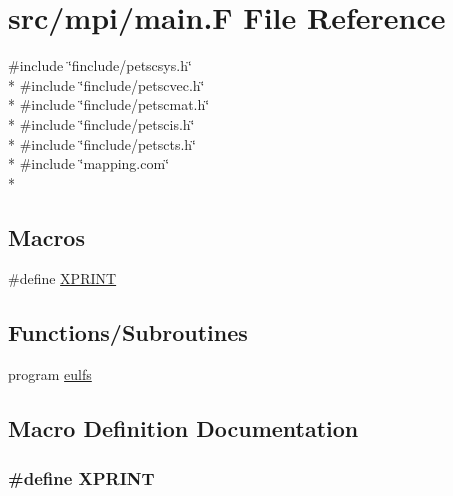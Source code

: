 \hypertarget{mpi_2main_8_f}{\section{src/mpi/main.F File Reference}
\label{mpi_2main_8_f}
}
{\ttfamily \#include \char`\"{}finclude/petscsys.\-h\char`\"{}}\\*
{\ttfamily \#include \char`\"{}finclude/petscvec.\-h\char`\"{}}\\*
{\ttfamily \#include \char`\"{}finclude/petscmat.\-h\char`\"{}}\\*
{\ttfamily \#include \char`\"{}finclude/petscis.\-h\char`\"{}}\\*
{\ttfamily \#include \char`\"{}finclude/petscts.\-h\char`\"{}}\\*
{\ttfamily \#include \char`\"{}mapping.\-com\char`\"{}}\\*
\subsection*{Macros}
\begin{DoxyCompactItemize}
\item 
\#define \hyperlink{mpi_2main_8_f_ab756f1b26b556714e9a9789d8f2d8f08}{X\-P\-R\-I\-N\-T}
\end{DoxyCompactItemize}
\subsection*{Functions/\-Subroutines}
\begin{DoxyCompactItemize}
\item 
program \hyperlink{mpi_2main_8_f_a8d200d2db3a3c1292d026e24f74c02e3}{eulfs}
\end{DoxyCompactItemize}


\subsection{Macro Definition Documentation}
\hypertarget{mpi_2main_8_f_ab756f1b26b556714e9a9789d8f2d8f08}{
\subsubsection[{X\-P\-R\-I\-N\-T}]{\setlength{\rightskip}{0pt plus 5cm}\#define X\-P\-R\-I\-N\-T}}\label{mpi_2main_8_f_ab756f1b26b556714e9a9789d8f2d8f08}


